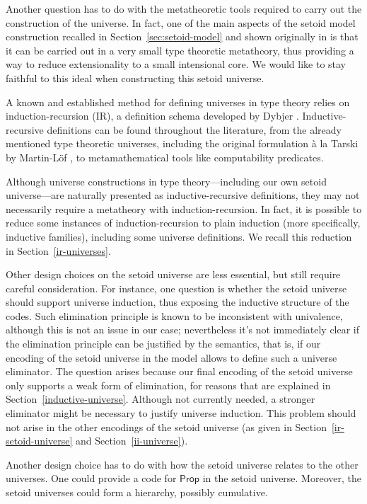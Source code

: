 \documentclass{easychair}
\newcommand{\Prop}{\textsf{Prop}}
\begin{document}
Another question has to do with the metatheoretic tools required to carry out
the construction of the universe. In fact, one of the main aspects of the setoid
model construction recalled in Section~\ref{sec:setoid-model} and shown originally
in \cite{setoid99} is that it can be carried out in a very small type theoretic
metatheory, thus providing a way to reduce extensionality to a small intensional
core.
%
We would like to stay faithful to this ideal when constructing this setoid
universe.

A known and established method for defining universes in type theory relies on
induction-recursion (IR), a definition schema developed by Dybjer
\cite{ir-dybjer, dybjer-setzer}. Inductive-recursive definitions can be found
throughout the literature, from the already mentioned type theoretic universes,
including the original formulation \`{a} la Tarski by Martin-L\"of
\cite{libretto}, to metamathematical tools like computability predicates.

Although universe constructions in type theory---including our own setoid
universe---are naturally presented as inductive-recursive definitions, they may
not necessarily require a metatheory with induction-recursion. In fact, it is
possible to reduce some instances of induction-recursion to plain induction
(more specifically, inductive families), including some universe definitions. We
recall this reduction in Section~\ref{ir-universes}.

Other design choices on the setoid universe are less essential, but still
require careful consideration. For instance, one question is whether the setoid
universe should support universe induction, thus exposing the inductive
structure of the codes. Such elimination principle is known to be inconsistent
with univalence, although this is not an issue in our case; nevertheless it's
not immediately clear if the elimination principle can be justified by the
semantics, that is, if our encoding of the setoid universe in the model allows
to define such a universe eliminator.
%
The question arises because our final encoding of the setoid universe only
supports a weak form of elimination, for reasons that are explained in
Section~\ref{inductive-universe}. Although not currently needed, a stronger
eliminator might be necessary to justify universe induction. This problem should
not arise in the other encodings of the setoid universe (as given in
Section~\ref{ir-setoid-universe} and Section~\ref{ii-universe}).

Another design choice has to do with how the setoid universe relates to the
other universes. One could provide a code for $\Prop$ in the setoid universe.
Moreover, the setoid universes could form a hierarchy, possibly
cumulative.
\end{document}

